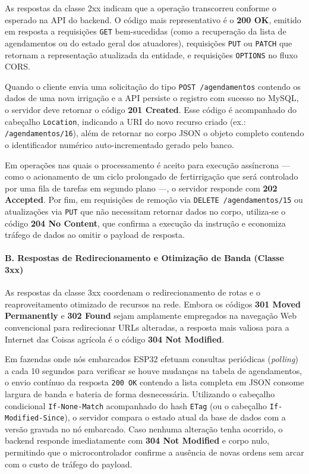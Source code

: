 As respostas da classe 2xx indicam que a operação transcorreu conforme o esperado na API do backend. O código mais representativo é o \textbf{200 OK}, emitido em resposta a requisições \texttt{GET} bem-sucedidas (como a recuperação da lista de agendamentos ou do estado geral dos atuadores), requisições \texttt{PUT} ou \texttt{PATCH} que retornam a representação atualizada da entidade, e requisições \texttt{OPTIONS} no fluxo CORS.

Quando o cliente envia uma solicitação do tipo \texttt{POST /agendamentos} contendo os dados de uma nova irrigação e a API persiste o registro com sucesso no MySQL, o servidor deve retornar o código \textbf{201 Created}. Esse código é acompanhado do cabeçalho \texttt{Location}, indicando a URI do novo recurso criado (ex.: \texttt{/agendamentos/16}), além de retornar no corpo JSON o objeto completo contendo o identificador numérico auto-incrementado gerado pelo banco.

Em operações nas quais o processamento é aceito para execução assíncrona — como o acionamento de um ciclo prolongado de fertirrigação que será controlado por uma fila de tarefas em segundo plano —, o servidor responde com \textbf{202 Accepted}. Por fim, em requisições de remoção via \texttt{DELETE /agendamentos/15} ou atualizações via \texttt{PUT} que não necessitam retornar dados no corpo, utiliza-se o código \textbf{204 No Content}, que confirma a execução da instrução e economiza tráfego de dados ao omitir o payload de resposta.

\paragraph*{B. Respostas de Redirecionamento e Otimização de Banda (Classe 3xx)}

As respostas da classe 3xx coordenam o redirecionamento de rotas e o reaproveitamento otimizado de recursos na rede. Embora os códigos \textbf{301 Moved Permanently} e \textbf{302 Found} sejam amplamente empregados na navegação Web convencional para redirecionar URLs alteradas, a resposta mais valiosa para a Internet das Coisas agrícola é o código \textbf{304 Not Modified}.

Em fazendas onde nós embarcados ESP32 efetuam consultas periódicas (\textit{polling}) a cada 10 segundos para verificar se houve mudanças na tabela de agendamentos, o envio contínuo da resposta \texttt{200 OK} contendo a lista completa em JSON consome largura de banda e bateria de forma desnecessária. Utilizando o cabeçalho condicional \texttt{If-None-Match} acompanhado do hash \texttt{ETag} (ou o cabeçalho \texttt{If-Modified-Since}), o servidor compara o estado atual da base de dados com a versão gravada no nó embarcado. Caso nenhuma alteração tenha ocorrido, o backend responde imediatamente com \textbf{304 Not Modified} e corpo nulo, permitindo que o microcontrolador confirme a ausência de novas ordens sem arcar com o custo de tráfego do payload.

